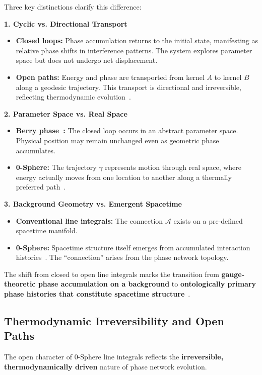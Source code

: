 \documentclass[12pt,letterpaper]{article}
\begin{document}
Three key distinctions clarify this difference:

\textbf{1. Cyclic vs. Directional Transport}
\begin{itemize}
\item \textbf{Closed loops:} Phase accumulation returns to the initial state, manifesting as relative phase shifts in interference patterns. The system explores parameter space but does not undergo net displacement.
\item \textbf{Open paths:} Energy and phase are transported from kernel $A$ to kernel $B$ along a geodesic trajectory. This transport is directional and irreversible, reflecting thermodynamic evolution~\cite{hanamura18356895}.
\end{itemize}

\textbf{2. Parameter Space vs. Real Space}
\begin{itemize}
\item \textbf{Berry phase~\cite{Berry1984}:} The closed loop occurs in an abstract parameter space. Physical position may remain unchanged even as geometric phase accumulates.
\item \textbf{0-Sphere:} The trajectory $\gamma$ represents motion through real space, where energy actually moves from one location to another along a thermally preferred path~\cite{hanamura18356895}.
\end{itemize}

\textbf{3. Background Geometry vs. Emergent Spacetime}
\begin{itemize}
\item \textbf{Conventional line integrals:} The connection $\mathcal{A}$ exists on a pre-defined spacetime manifold.
\item \textbf{0-Sphere:} Spacetime structure itself emerges from accumulated interaction histories~\cite{hanamura18135855}. The ``connection'' arises from the phase network topology.
\end{itemize}

The shift from closed to open line integrals marks the transition from \textbf{gauge-theoretic phase accumulation on a background} to \textbf{ontologically primary phase histories that constitute spacetime structure}~\cite{hanamura18203433}.

\subsection{Thermodynamic Irreversibility and Open Paths}

The open character of 0-Sphere line integrals reflects the \textbf{irreversible, thermodynamically driven} nature of phase network evolution.
\end{document}
